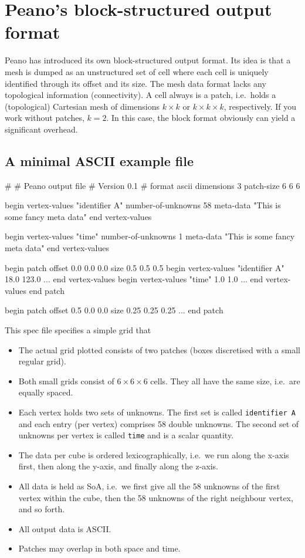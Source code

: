 \section{Peano's block-structured output format}


Peano has introduced its own block-structured output format.
Its idea is that a mesh is dumped as an unstructured set of cell where each cell
is uniquely identified through its offset and its size. 
The mesh data format lacks any topological information (connectivity).
A cell always is a patch, i.e.~holds a (topological) Cartesian mesh of
dimensions $k \times k$ or $k \times k \times k $, respectively.
If you work without patches, $k=2$. 
In this case, the block format obviously can yield a significant overhead.



\subsection{A minimal ASCII example file}
\begin{code}
#
# Peano output file
# Version 0.1
#
format ascii
dimensions 3
patch-size 6 6 6

begin vertex-values "identifier A"
  number-of-unknowns 58
  meta-data "This is some fancy meta data"  
end vertex-values

begin vertex-values "time"
  number-of-unknowns 1
  meta-data "This is some fancy meta data"  
end vertex-values

begin patch
  offset 0.0 0.0 0.0
  size   0.5 0.5 0.5
  begin vertex-values "identifier A"
    18.0 123.0 ...
  end vertex-values
  begin vertex-values "time"
    1.0 1.0 ...
  end vertex-values
end patch 

begin patch
  offset 0.5 0.0 0.0
  size   0.25 0.25 0.25
  ...
end patch 
\end{code}

\noindent
This spec file specifies a simple grid that

\begin{itemize}
  \item The actual grid plotted consists of two patches (boxes discretised with
  a small regular grid).
  \item Both small grids consist of $6 \times 6 \times 6$ cells. They all have
  the same size, i.e.~are equally spaced. 
  \item Each vertex holds two sets of unknowns. The first set is called
  \texttt{identifier A} and each entry (per vertex) comprises 58 double
  unknowns. The second set of unknowns per vertex is called \texttt{time} and is
  a scalar quantity.
  \item The data per cube is ordered lexicographically, i.e.~we run along the
  x-axis first, then along the y-axis, and finally along the z-axis. 
  \item All data is held as SoA, i.e.~we first give all the 58 unknowns of the
  first vertex within the cube, then the 58 unknowns of the right neighbour
  vertex, and so forth.
  \item All output data is ASCII.
  \item Patches may overlap in both space and time.
\end{itemize}


